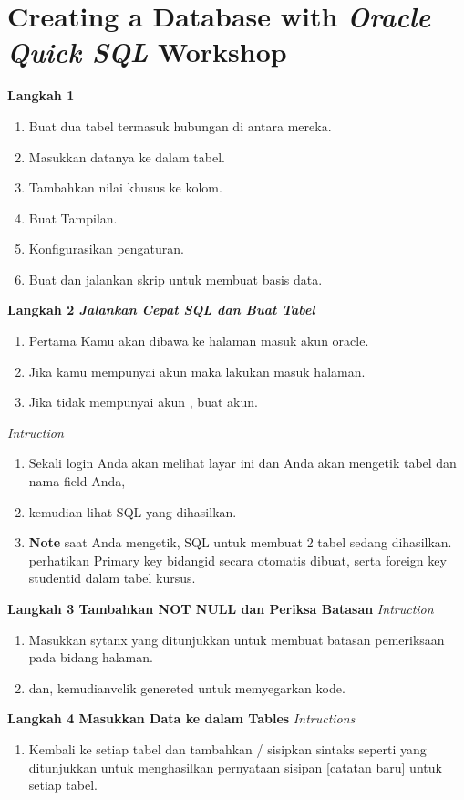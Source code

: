 \documentclass[12pt, times new roman, a4paper]{article}
\begin{document}
\section{Creating a Database with \textit{Oracle Quick SQL} Workshop}
\textbf{Langkah 1}
\begin{enumerate}
    \item Buat dua tabel termasuk hubungan di antara mereka.
    \item Masukkan datanya ke dalam tabel.
    \item Tambahkan nilai khusus ke kolom.
    \item Buat Tampilan.
    \item Konfigurasikan pengaturan.
    \item Buat dan jalankan skrip untuk membuat basis data.\\
    \end{enumerate}
\textbf{Langkah 2 \textit{Jalankan Cepat SQL dan Buat Tabel}}
\begin{enumerate}
    \item Pertama Kamu akan dibawa ke halaman masuk akun oracle.
    \item Jika kamu mempunyai akun maka lakukan masuk halaman.
    \item Jika tidak mempunyai akun , buat akun.
    \end{enumerate}
\textit{Intruction}
\begin{enumerate}
    \item Sekali login Anda akan melihat layar ini dan Anda akan mengetik tabel dan nama field Anda,
    \item kemudian lihat SQL yang dihasilkan.
    \item \textbf{Note} saat Anda mengetik, SQL untuk membuat 2 tabel sedang dihasilkan. perhatikan Primary key bidang\textunderscore id secara otomatis dibuat, serta foreign key student\textunderscore id dalam tabel kursus.
\end{enumerate}
\textbf{Langkah 3 Tambahkan NOT NULL dan Periksa Batasan}
\textit{Intruction}
\begin{enumerate}
    \item Masukkan sytanx yang ditunjukkan untuk membuat batasan pemeriksaan pada bidang halaman.
    \item dan, kemudianvclik genereted untuk memyegarkan kode.
\end{enumerate}
\textbf{Langkah 4 Masukkan Data ke dalam Tables}
\textit{Intructions}
\begin{enumerate}
    \item Kembali ke setiap tabel dan tambahkan / sisipkan sintaks seperti yang ditunjukkan untuk menghasilkan pernyataan sisipan [catatan baru] untuk setiap tabel.
\end{enumerate}
\end{document}
